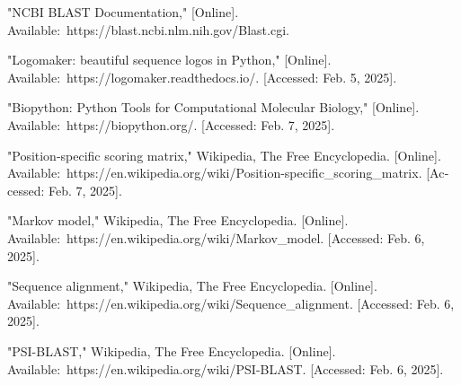 \begin{thebibliography}{1}
        \begin{latin}
            "NCBI BLAST Documentation," [Online].\\
            Available: https://blast.ncbi.nlm.nih.gov/Blast.cgi.
        \end{latin}

        \begin{latin}
            "Logomaker: beautiful sequence logos in Python," [Online]. \\
            Available: https://logomaker.readthedocs.io/. [Accessed: Feb. 5, 2025].
        \end{latin}

        \begin{latin}
            "Biopython: Python Tools for Computational Molecular Biology," [Online]. \\ Available: https://biopython.org/. [Accessed: Feb. 7, 2025].
        \end{latin}

        \begin{latin}
            "Position-specific scoring matrix," Wikipedia, The Free Encyclopedia. [Online]. \\
            Available: https://en.wikipedia.org/wiki/Position-specific\_scoring\_matrix. [Accessed: Feb. 7, 2025].
        \end{latin}

        \begin{latin}
             "Markov model," Wikipedia, The Free Encyclopedia. [Online]. \\
             Available: https://en.wikipedia.org/wiki/Markov\_model. [Accessed: Feb. 6, 2025].
        \end{latin}

        \begin{latin}
            "Sequence alignment," Wikipedia, The Free Encyclopedia. [Online]. \\
            Available: https://en.wikipedia.org/wiki/Sequence\_alignment. [Accessed: Feb. 6, 2025].
        \end{latin}

        \begin{latin}
            "PSI-BLAST," Wikipedia, The Free Encyclopedia. [Online]. \\Available: https://en.wikipedia.org/wiki/PSI-BLAST. [Accessed: Feb. 6, 2025].
        \end{latin}


\end{thebibliography}
